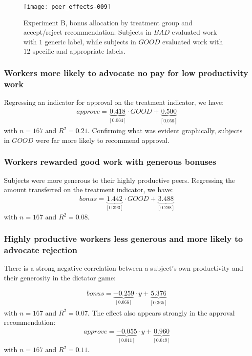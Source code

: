 \documentclass[12pt]{article}
\begin{document}
\begin{figure} 
  \centering
\texttt{[image: peer\_effects-009]}
\caption{Experiment B, bonus allocation by treatment group and
  accept/reject recommendation. Subjects in $BAD$ evaluated work with
  $1$ generic label, while subjects in $GOOD$ evaluated work with $12$
  specific and appropriate labels.\label{fig:Exp.b.a.hist}}
\end{figure} 

\subsubsection{Workers more likely to advocate no pay for low productivity work} 

Regressing an indicator for approval on the treatment indicator, we
have:
\begin{align}
  approve = \underbrace{0.418}_{[0.064]}\cdot GOOD + 
\underbrace{0.500}_{[0.056]}
\end{align} with $n =
167$ and $R^2 = 0.21$. Confirming what was
evident graphically, subjects in $GOOD$ were far more likely to
recommend approval.

\subsubsection{Workers rewarded good work with generous bonuses} 

Subjects were more generous to their highly productive peers.
Regressing the amount transferred on the treatment indicator, we have:
\begin{align}
  bonus =  \underbrace{1.442}_{[0.393]}\cdot GOOD + 
  \underbrace{3.488}_{[0.298]} 
\end{align}
with $n = 167$ and $R^2 = 0.08$. 

\subsubsection{Highly productive workers less generous and more likely to advocate rejection} 


There is a strong negative correlation between a subject's own
productivity and their generosity in the dictator game:

\begin{align}bonus = \underbrace{-0.259}_{[0.066]} \cdot y + 
  \underbrace{5.376}_{[0.365]} \end{align} 
with $n = 167$ and $R^2 = 0.07$. The
effect also appears strongly in the approval recommendation:
\begin{align}
  approve = \underbrace{-0.055}_{[0.011]} \cdot y + 
  \underbrace{0.960}_{[0.049]} \end{align} 
with $n = 167$ and $R^2 = 0.11$. 
\end{document}
